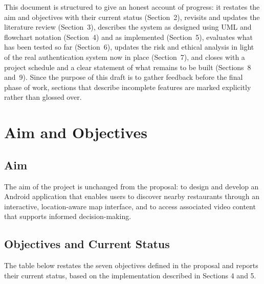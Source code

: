 \documentclass[12pt, a4paper]{article}
\begin{document}
This document is structured to give an honest account of progress: it restates the aim and objectives with their current status (Section~2), revisits and updates the literature review (Section~3), describes the system as designed using UML and flowchart notation (Section~4) and as implemented (Section~5), evaluates what has been tested so far (Section~6), updates the risk and ethical analysis in light of the real authentication system now in place (Section~7), and closes with a project schedule and a clear statement of what remains to be built (Sections~8 and~9). Since the purpose of this draft is to gather feedback before the final phase of work, sections that describe incomplete features are marked explicitly rather than glossed over.

\section{Aim and Objectives}

\subsection*{Aim}

The aim of the project is unchanged from the proposal: to design and develop an Android application that enables users to discover nearby restaurants through an interactive, location-aware map interface, and to access associated video content that supports informed decision-making.

\subsection*{Objectives and Current Status}

The table below restates the seven objectives defined in the proposal and reports their current status, based on the implementation described in Sections 4 and 5.
\end{document}
